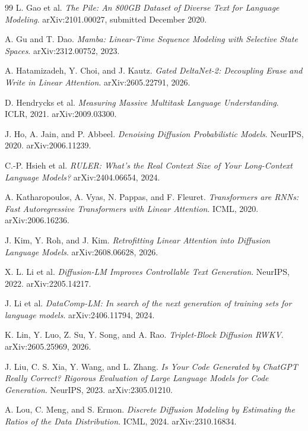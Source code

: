 \documentclass{article}
\theoremstyle{remark}\newtheorem{remark}[theorem]{Remark}
\begin{document}
\begin{thebibliography}{99}
 L. Gao et al. \emph{The Pile: An 800GB Dataset of Diverse Text for Language Modeling}. arXiv:2101.00027, submitted December 2020.

 A. Gu and T. Dao. \emph{Mamba: Linear-Time Sequence Modeling with Selective State Spaces}. arXiv:2312.00752, 2023.

 A. Hatamizadeh, Y. Choi, and J. Kautz. \emph{Gated DeltaNet-2: Decoupling Erase and Write in Linear Attention}. arXiv:2605.22791, 2026.

 D. Hendrycks et al. \emph{Measuring Massive Multitask Language Understanding}. ICLR, 2021. arXiv:2009.03300.

 J. Ho, A. Jain, and P. Abbeel. \emph{Denoising Diffusion Probabilistic Models}. NeurIPS, 2020. arXiv:2006.11239.

 C.-P. Hsieh et al. \emph{RULER: What's the Real Context Size of Your Long-Context Language Models?} arXiv:2404.06654, 2024.

 A. Katharopoulos, A. Vyas, N. Pappas, and F. Fleuret. \emph{Transformers are RNNs: Fast Autoregressive Transformers with Linear Attention}. ICML, 2020. arXiv:2006.16236.

 J. Kim, Y. Roh, and J. Kim. \emph{Retrofitting Linear Attention into Diffusion Language Models}. arXiv:2608.06628, 2026.

 X. L. Li et al. \emph{Diffusion-LM Improves Controllable Text Generation}. NeurIPS, 2022. arXiv:2205.14217.

 J. Li et al. \emph{DataComp-LM: In search of the next generation of training sets for language models}. arXiv:2406.11794, 2024.

 K. Lin, Y. Luo, Z. Su, Y. Song, and A. Rao. \emph{Triplet-Block Diffusion RWKV}. arXiv:2605.25969, 2026.

 J. Liu, C. S. Xia, Y. Wang, and L. Zhang. \emph{Is Your Code Generated by ChatGPT Really Correct? Rigorous Evaluation of Large Language Models for Code Generation}. NeurIPS, 2023. arXiv:2305.01210.

 A. Lou, C. Meng, and S. Ermon. \emph{Discrete Diffusion Modeling by Estimating the Ratios of the Data Distribution}. ICML, 2024. arXiv:2310.16834.


\end{thebibliography}
\end{document}
